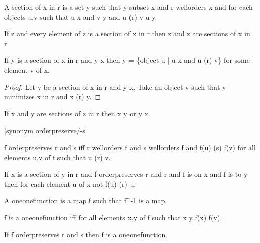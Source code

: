 \documentclass[a4paper,draft]{amsproc}
\begin{document}
\begin{forthel}
\begin{definition}[89]
A section of x in r is a set y such that y subset x and r wellorders x
and for each objects u,v such that u \in x and v \in y and u (r) v u \in y.
\end{definition}

\begin{theorem}[90]
If z  and every element of z is a section of x in r then \bigcup z and \bigcap z are sections of x in r.
\end{theorem}

\begin{theorem}[91]
If y is a section of x in r and y \neq x then
y = \{object u | u \in x and u (r) v\} for some element v of x.
\end{theorem}
\begin{proof}
Let y be a section of x in r and y \neq x.
Take an object v such that v minimizes x in r and x (r) y.
\end{proof}

\begin{theorem}[92]
If x and y are sections of z in r then x \subset y or y \subset x.
\end{theorem}

[synonym orderpreserve/-s]
\begin{definition}[93]
f orderpreserves r and s iff r wellorders \domain f and s wellorders \range f
and f(u) (s) f(v) for all elements u,v of \domain f such that u (r) v.
\end{definition}

\begin{theorem}[94]
If x is a section of y in r and f orderpreserves r and r and f is on x and f is to y
then for each element u of x not f(u) (r) u.
\end{theorem}

\begin{definition}[95]
A oneonefunction is a map f such that f^{-1} is a map.
\end{definition}

\begin{lemma}
f is a oneonefunction iff for all elements x,y of \domain f such that x \neq y f(x) \neq f(y).
\end{lemma}

\begin{theorem}[96a]
If f orderpreserves r and s then f is a oneonefunction.
\end{theorem}


\end{forthel}
\end{document}
